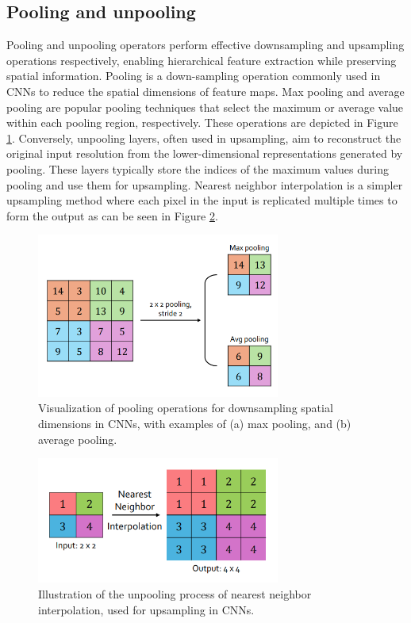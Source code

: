 \subsection{Pooling and unpooling} Pooling and unpooling operators perform effective downsampling and upsampling operations respectively, enabling hierarchical feature extraction while preserving spatial information. Pooling is a down-sampling operation commonly used in CNNs to reduce the spatial dimensions of feature maps. Max pooling and average pooling are popular pooling techniques that select the maximum or average value within each pooling region, respectively. These operations are depicted in Figure \ref{fig:Pool}. Conversely, unpooling layers, often used in upsampling, aim to reconstruct the original input resolution from the lower-dimensional representations generated by pooling. These layers typically store the indices of the maximum values during pooling and use them for upsampling. Nearest neighbor interpolation is a simpler upsampling method where each pixel in the input is replicated multiple times to form the output as can be seen in Figure \ref{fig:Unpool2}.
\begin{figure}[ht]
    \centering
    \includegraphics[width=8cm]{images/Theory-DL/Pool.png}
    \caption{Visualization of pooling operations for downsampling spatial dimensions in CNNs, with examples of (a) max pooling, and (b) average pooling.}
    \label{fig:Pool}
\end{figure}
\begin{figure}[ht]
        \centering
        \includegraphics[width=8cm]{images/Theory-DL/NNUnpool.png}
        \caption{Illustration of the unpooling process of nearest neighbor interpolation, used for upsampling in CNNs.}
        \label{fig:Unpool2}
    \end{figure}
